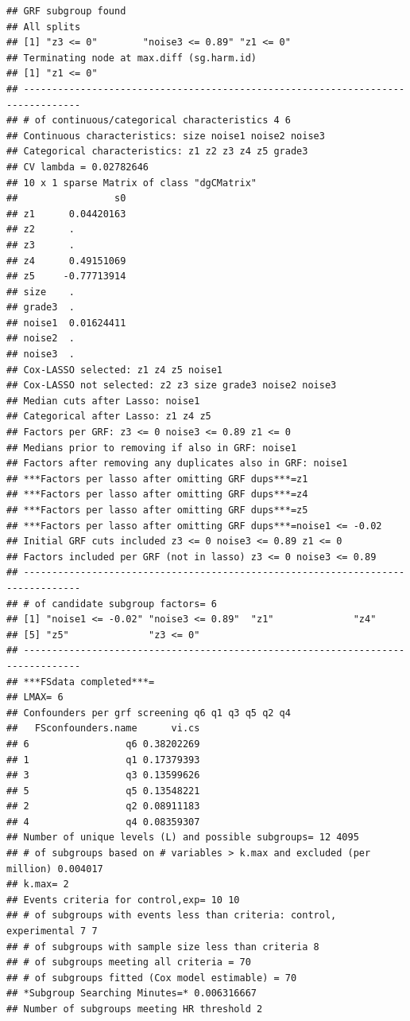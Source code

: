 \documentclass[12pt]{article}
\makeatletter
\newenvironment{kframe}{%
 \def\at@end@of@kframe{}%
 \ifinner\ifhmode%
  \def\at@end@of@kframe{\end{minipage}}%
  \begin{minipage}{\columnwidth}%
 \fi\fi%
 \def\FrameCommand##1{\hskip\@totalleftmargin \hskip-\fboxsep
 \colorbox{shadecolor}{##1}\hskip-\fboxsep
     \hskip-\linewidth \hskip-\@totalleftmargin \hskip\columnwidth}%
 \MakeFramed {\advance\hsize-\width
   \@totalleftmargin\z@ \linewidth\hsize
   \@setminipage}}%
 {\par\unskip\endMakeFramed%
 \at@end@of@kframe}
\newenvironment{knitrout}{}{} %
\makeatother
\begin{document}
\begin{knitrout}
\begin{kframe}
\begin{verbatim}
## GRF subgroup found
## All splits
## [1] "z3 <= 0"        "noise3 <= 0.89" "z1 <= 0"       
## Terminating node at max.diff (sg.harm.id)
## [1] "z1 <= 0"
## --------------------------------------------------------------------------------
## # of continuous/categorical characteristics 4 6 
## Continuous characteristics: size noise1 noise2 noise3 
## Categorical characteristics: z1 z2 z3 z4 z5 grade3 
## CV lambda = 0.02782646 
## 10 x 1 sparse Matrix of class "dgCMatrix"
##                 s0
## z1      0.04420163
## z2      .         
## z3      .         
## z4      0.49151069
## z5     -0.77713914
## size    .         
## grade3  .         
## noise1  0.01624411
## noise2  .         
## noise3  .         
## Cox-LASSO selected: z1 z4 z5 noise1 
## Cox-LASSO not selected: z2 z3 size grade3 noise2 noise3 
## Median cuts after Lasso: noise1 
## Categorical after Lasso: z1 z4 z5 
## Factors per GRF: z3 <= 0 noise3 <= 0.89 z1 <= 0 
## Medians prior to removing if also in GRF: noise1 
## Factors after removing any duplicates also in GRF: noise1 
## ***Factors per lasso after omitting GRF dups***=z1
## ***Factors per lasso after omitting GRF dups***=z4
## ***Factors per lasso after omitting GRF dups***=z5
## ***Factors per lasso after omitting GRF dups***=noise1 <= -0.02
## Initial GRF cuts included z3 <= 0 noise3 <= 0.89 z1 <= 0 
## Factors included per GRF (not in lasso) z3 <= 0 noise3 <= 0.89 
## --------------------------------------------------------------------------------
## # of candidate subgroup factors= 6 
## [1] "noise1 <= -0.02" "noise3 <= 0.89"  "z1"              "z4"             
## [5] "z5"              "z3 <= 0"        
## --------------------------------------------------------------------------------
## ***FSdata completed***=
## LMAX= 6 
## Confounders per grf screening q6 q1 q3 q5 q2 q4 
##   FSconfounders.name      vi.cs
## 6                 q6 0.38202269
## 1                 q1 0.17379393
## 3                 q3 0.13599626
## 5                 q5 0.13548221
## 2                 q2 0.08911183
## 4                 q4 0.08359307
## Number of unique levels (L) and possible subgroups= 12 4095 
## # of subgroups based on # variables > k.max and excluded (per million) 0.004017 
## k.max= 2 
## Events criteria for control,exp= 10 10 
## # of subgroups with events less than criteria: control, experimental 7 7 
## # of subgroups with sample size less than criteria 8 
## # of subgroups meeting all criteria = 70 
## # of subgroups fitted (Cox model estimable) = 70 
## *Subgroup Searching Minutes=* 0.006316667 
## Number of subgroups meeting HR threshold 2 

\end{verbatim}
\end{kframe}
\end{knitrout}
\end{document}
